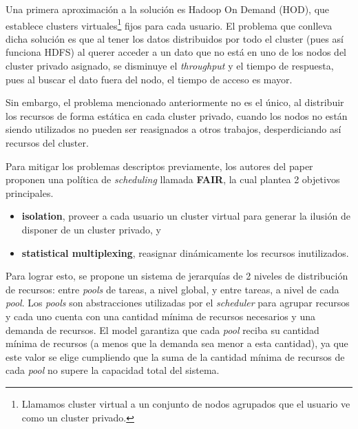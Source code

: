 \documentclass[a4paper]{article}
\begin{document}
Una primera aproximación a la solución es Hadoop On Demand (HOD), que establece
clusters virtuales\footnote{Llamamos cluster virtual a un conjunto de nodos
agrupados que el usuario ve como un cluster privado.} fijos para cada usuario.
El problema que conlleva dicha solución es que al tener los datos distribuidos
por todo el cluster (pues así funciona HDFS) al querer acceder a un dato que no
está en uno de los nodos del cluster privado asignado, se disminuye el
\textit{throughput} y el tiempo de respuesta, pues al buscar el dato fuera del
nodo, el tiempo de acceso es mayor.

Sin embargo, el problema mencionado anteriormente no es el único, al distribuir
los recursos de forma estática en cada cluster privado, cuando los nodos no
están siendo utilizados no pueden ser reasignados a otros trabajos,
desperdiciando así recursos del cluster.

Para mitigar los problemas descriptos previamente, los autores del paper
proponen una política de \textit{scheduling} llamada \textbf{FAIR}, la cual
plantea 2 objetivos principales.
\begin{itemize}
  \item \textbf{isolation}, proveer a cada usuario un cluster virtual para
  generar la ilusión de disponer de un cluster privado, y
	\item \textbf{statistical multiplexing}, reasignar dinámicamente los recursos
  inutilizados.
\end{itemize}

Para lograr esto, se propone un sistema de jerarquías de 2 niveles de
distribución de recursos: entre \textit{pools} de tareas, a nivel global, y
entre tareas, a nivel de cada \textit{pool}. Los \textit{pools} son
abstracciones utilizadas por el \textit{scheduler} para agrupar recursos y cada
uno cuenta con una cantidad mínima de recursos necesarios y una demanda de
recursos. El model garantiza que cada \textit{pool} reciba su cantidad mínima
de recursos (a menos que la demanda sea menor a esta cantidad), ya que este
valor se elige cumpliendo que la suma de la cantidad mínima de recursos de cada
\textit{pool} no supere la capacidad total del sistema.
\end{document}
